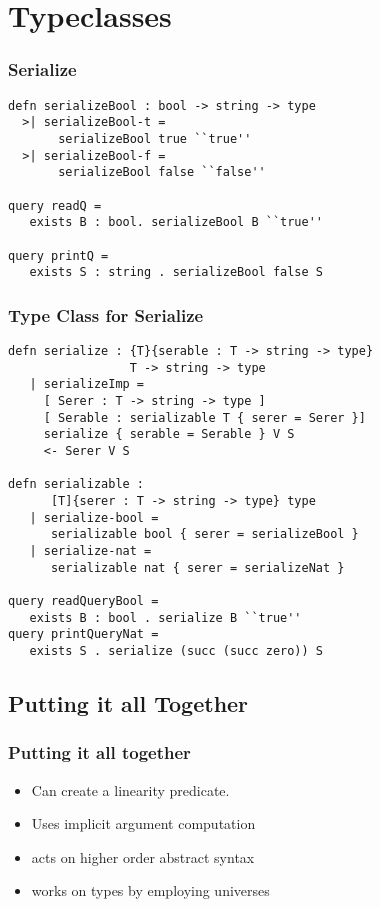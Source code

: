 \section{Typeclasses}
\begin{frame}[fragile]
\frametitle{Serialize}

\begin{lstlisting}
defn serializeBool : bool -> string -> type
  >| serializeBool-t = 
       serializeBool true ``true''
  >| serializeBool-f = 
       serializeBool false ``false''

query readQ = 
   exists B : bool. serializeBool B ``true''

query printQ = 
   exists S : string . serializeBool false S
\end{lstlisting}

\end{frame}

\begin{frame}[fragile]
\frametitle{Type Class for Serialize}

\begin{lstlisting}
defn serialize : {T}{serable : T -> string -> type} 
                 T -> string -> type
   | serializeImp = 
     [ Serer : T -> string -> type ]
     [ Serable : serializable T { serer = Serer }]
     serialize { serable = Serable } V S
     <- Serer V S

defn serializable : 
      [T]{serer : T -> string -> type} type
   | serialize-bool = 
      serializable bool { serer = serializeBool }
   | serialize-nat = 
      serializable nat { serer = serializeNat }

query readQueryBool = 
   exists B : bool . serialize B ``true''
query printQueryNat = 
   exists S . serialize (succ (succ zero)) S
\end{lstlisting}

\end{frame}


\subsection[Linearity]{Putting it all Together}

\begin{frame}
\frametitle{Putting it all together}
\begin{itemize}
\item Can create a linearity predicate.
\item Uses implicit argument computation
\item acts on higher order abstract syntax
\item works on types by employing universes
\end{itemize}
\end{frame}


